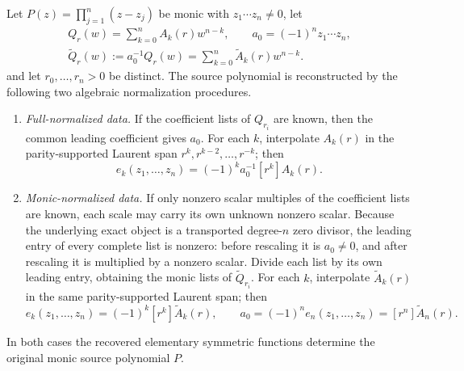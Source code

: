 \begin{lemma}\label{lem:full-monic-multiscale-normalization}
Let \(P(z)=\prod_{j=1}^{n}(z-z_j)\) be monic with \(z_1\cdots z_n\ne0\), let
\[
\begin{gathered}
Q_r(w)=\sum_{k=0}^{n}A_k(r)w^{n-k},
\qquad
a_0=(-1)^nz_1\cdots z_n,\\
\widetilde Q_r(w):=a_0^{-1}Q_r(w)
=\sum_{k=0}^{n}\widetilde A_k(r)w^{n-k}.
\end{gathered}
\]
and let \(r_0,
\dots,r_n>0\) be distinct.  The source polynomial is reconstructed by the following two algebraic normalization procedures.
\begin{enumerate}[label=\textup{(\roman*)}]
\item \emph{Full-normalized data.}  If the coefficient lists of \(Q_{r_i}\) are known, then the common leading coefficient gives \(a_0\).  For each \(k\), interpolate \(A_k(r)\) in the parity-supported Laurent span \(r^k,r^{k-2},
\dots,r^{-k}\); then
\[
e_k(z_1,
\dots,z_n)=(-1)^k a_0^{-1}[r^k]A_k(r).
\]
\item \emph{Monic-normalized data.}  If only nonzero scalar multiples of the coefficient lists are known, each scale may carry its own unknown nonzero scalar.  Because the underlying exact object is a transported degree-\(n\) zero divisor, the leading entry of every complete list is nonzero: before rescaling it is \(a_0\ne0\), and after rescaling it is multiplied by a nonzero scalar.  Divide each list by its own leading entry, obtaining the monic lists of \(\widetilde Q_{r_i}\).  For each \(k\), interpolate \(\widetilde A_k(r)\) in the same parity-supported Laurent span; then
\[
e_k(z_1,
\dots,z_n)=(-1)^k[r^k]\widetilde A_k(r),
\qquad
a_0=(-1)^ne_n(z_1,
\dots,z_n)=[r^n]\widetilde A_n(r).
\]
\end{enumerate}
In both cases the recovered elementary symmetric functions determine the original monic source polynomial \(P\).
\end{lemma}

